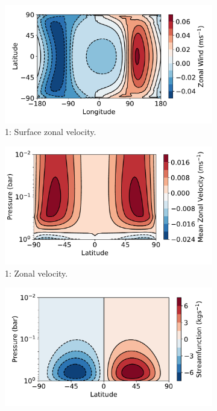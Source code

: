 \begin{figure}
  \centering

  \begin{subfigure}[t]{0.31\textwidth}
    \includegraphics[width=\textwidth]{figures/eqm-zonal-flow/zonal-wind-map-tide-day1.pdf}
    \caption{1: Surface zonal velocity.}
  \end{subfigure}
\enskip
  \begin{subfigure}[t]{0.31\textwidth}
    \includegraphics[width=\textwidth]{figures/eqm-zonal-flow/zonal-wind-tide-day1.pdf}
    \caption{1: Zonal velocity.}
  \end{subfigure}
\enskip
  \begin{subfigure}[t]{0.31\textwidth}
    \includegraphics[width=\textwidth]{figures/eqm-zonal-flow/streamfunction-tide-day1.pdf}

\end{subfigure}
\end{figure}
